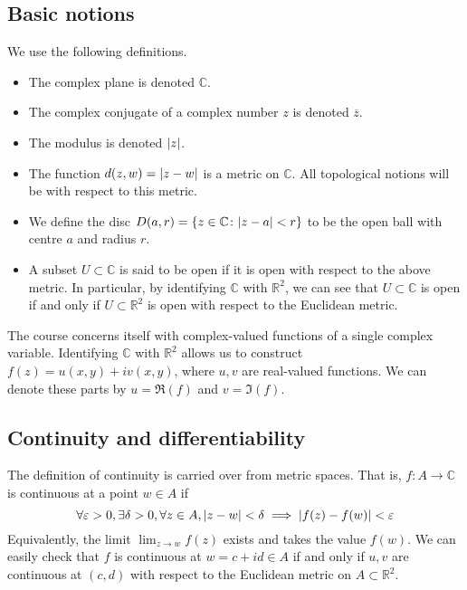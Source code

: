 \subsection{Basic notions}
We use the following definitions.
\begin{itemize}
	\item The complex plane is denoted \( \mathbb C \).
	\item The complex conjugate of a complex number \( z \) is denoted \( \overline z \).
	\item The modulus is denoted \( \abs{z} \).
	\item The function \( d(z,w) = \abs{z - w} \) is a metric on \( \mathbb C \).
	      All topological notions will be with respect to this metric.
	\item We define the disc \( D(a,r) = \qty{z \in \mathbb C \colon \abs{z-a}<r} \) to be the open ball with centre \( a \) and radius \( r \).
	\item A subset \( U \subset \mathbb C \) is said to be open if it is open with respect to the above metric.
	      In particular, by identifying \( \mathbb C \) with \( \mathbb R^2 \), we can see that \( U \subset \mathbb C \) is open if and only if \( U \subset \mathbb R^2 \) is open with respect to the Euclidean metric.
\end{itemize}
The course concerns itself with complex-valued functions of a single complex variable.
Identifying \( \mathbb C \) with \( \mathbb R^2 \) allows us to construct \( f(z) = u(x,y) + i v(x,y) \), where \( u,v \) are real-valued functions.
We can denote these parts by \( u = \Re(f) \) and \( v = \Im(f) \).

\subsection{Continuity and differentiability}
The definition of continuity is carried over from metric spaces.
That is, \( f \colon A \to \mathbb C \) is continuous at a point \( w \in A \) if
\[
	\forall \varepsilon > 0, \exists \delta > 0, \forall z \in A, \abs{z-w} < \delta \implies \abs{f(z) - f(w)} < \varepsilon
\]
Equivalently, the limit \( \lim_{z \to w} f(z) \) exists and takes the value \( f(w) \).
We can easily check that \( f \) is continuous at \( w = c + id \in A \) if and only if \( u, v \) are continuous at \( (c,d) \) with respect to the Euclidean metric on \( A \subset \mathbb R^2 \).

